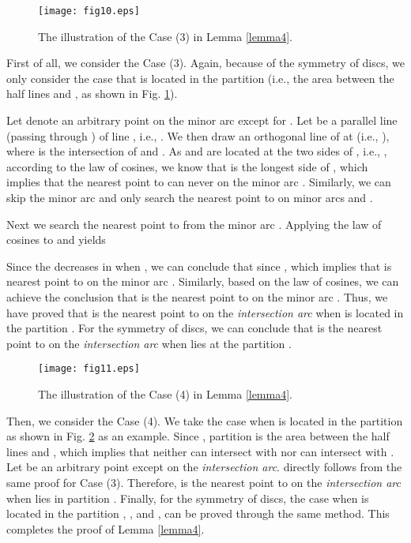 \documentclass[journal]{IEEEtran}
\begin{document}
\begin{IEEEproof}
\begin{figure}
\begin{center}
\texttt{[image: fig10.eps]}    \caption{The illustration of the Case (3) in Lemma \ref{lemma4}.}
\label{fig10}                                 \end{center}                                 \end{figure}
First of all, we consider the Case (3). Again, because of the symmetry of discs, we only consider the case that  is located in the
partition  (i.e., the area between the half lines  and , as shown in Fig. \ref{fig10}).

Let  denote an arbitrary point on the minor arc  except for . Let  be a parallel line (passing through )
of line , i.e., . We then draw an orthogonal line  of  at  (i.e., ), where  is
the intersection of  and . As  and  are located at the two sides of , i.e., ,
according to the law of cosines, we know that  is the longest side of , which implies that the nearest point to  can
never on the minor arc . Similarly, we can skip the minor arc  and only search the nearest point to
 on minor arcs  and .

Next we search the nearest point to  from the minor arc . Applying the law of cosines to  and 
yields

Since the  decreases in  when , we can conclude that  since , which implies
that  is nearest point to  on the minor arc . Similarly, based on the law of cosines, we can achieve the conclusion that
 is the nearest point to  on the minor arc . Thus, we have proved that  is the nearest point to  on the
\emph{intersection arc} when  is located in the partition . For the symmetry of discs, we can conclude that  is the nearest point
to  on the \emph{intersection arc} when  lies at the partition .

\begin{figure}
\begin{center}
\texttt{[image: fig11.eps]}    \caption{The illustration of the Case (4) in Lemma \ref{lemma4}.}
\label{fig11}                                 \end{center}                                 \end{figure}

Then, we consider the Case (4). We take the case when  is located in the partition
 as shown in Fig. \ref{fig11} as an example. Since , partition  is the area between the half lines  and , which implies that neither 
can intersect with  nor  can intersect with . Let  be an arbitrary point except  on the
\emph{intersection arc}.  directly follows from the same proof for Case (3). Therefore,  is the nearest point to  on the
\emph{intersection arc} when  lies in partition . Finally, for the symmetry of discs, the case when  is located
in the partition , ,  and , can be proved through the same method. This completes the proof of Lemma \ref{lemma4}.
\end{IEEEproof}
\end{document}
